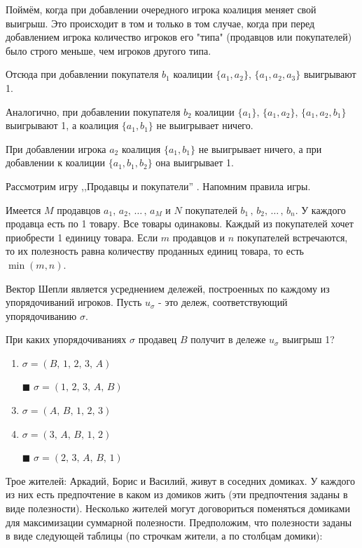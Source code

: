 	\solution
	Поймём, когда при добавлении очередного игрока коалиция меняет свой выигрыш. Это происходит в том и только в том случае, когда при перед добавлением игрока количество игроков его "типа" (продавцов или покупателей) было строго меньше, чем игроков другого типа.
	
	Отсюда при добавлении покупателя $b_1$ коалиции $\{a_1,a_2\}$, $\{a_1,a_2,a_3\}$ выигрывают 1.
	
	Аналогично, при добавлении покупателя $b_2$ коалиции $\{a_1\}$, $\{a_1,a_2\}$, $\{a_1,a_2,b_1\}$ выигрывают 1, а коалиция $\{a_1,b_1\}$ не выигрывает ничего.
	
	При добавлении игрока $a_2$ коалиция $\{a_1,b_1\}$ не выигрывает ничего, а при добавлении к коалиции $\{a_1,b_1,b_2\}$ она выигрывает 1.
	
	\task
	Рассмотрим игру ,,Продавцы и покупатели'' . Напомним правила игры.
	
	Имеется $M$ продавцов $a_1,\,a_2,\,\ldots\,,\,a_M$ и $N$ покупателей $b_1\,,\,b_2,\,\ldots\,,\,b_n$. У каждого продавца есть по 1 товару. Все товары одинаковы. Каждый из покупателей хочет приобрести 1 единицу товара. Если $m$ продавцов и $n$ покупателей встречаются, то их полезность равна количеству проданных единиц товара, то есть $\min(m,n)$.
	
	Вектор Шепли является усреднением дележей, построенных по каждому из упорядочиваний игроков. Пусть $u_{\sigma}$ - это дележ, соответствующий упорядочиванию $\sigma$.
	
	При каких упорядочиваниях $\sigma$ продавец $B$ получит в дележе $u_\sigma$ выигрыш 1?
	
	\begin{enumerate}[label=$\square$]
		\item $\sigma = (B,\, 1,\, 2,\, 3,\, A)$
		\item[$\blacksquare$] $\sigma = (1,\, 2,\, 3,\, A,\, B)$
		\item $\sigma = (A,\, B,\, 1,\, 2,\, 3)$
		\item $\sigma = (3,\, A,\, B,\, 1,\, 2)$
		\item[$\blacksquare$] $\sigma = (2,\, 3,\, A,\, B,\, 1)$
	\end{enumerate}

	\solution
	
	\task
	Трое жителей: Аркадий, Борис и Василий, живут в соседних домиках. У каждого из них есть предпочтение в каком из домиков жить (эти предпочтения заданы в виде полезности). Несколько жителей могут договориться поменяться домиками для максимизации суммарной полезности. Предположим, что полезности заданы в виде следующей таблицы (по строчкам жители, а по столбцам домики):
	
